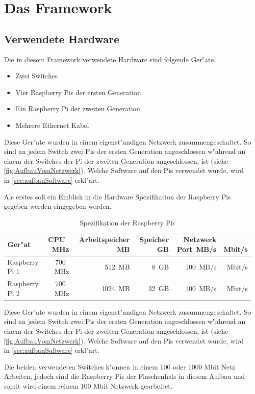 \chapter{Das Framework}
\label{cha:framework}


\section{Verwendete Hardware} \label{sec:verwendeteHardware}
Die in diesem Framework verwendete Hardware sind folgende Ger"ate. %
\begin{itemize}
\item Zwei Switches
\item Vier Raspberry Pis der ersten Generation
\item Ein Raspberry Pi der zweiten Generation
\item Mehrere Ethernet Kabel
\end{itemize}
Diese Ger"ate wurden in einem eigenst"andigen Netzwerk zusammengeschaltet. So sind an jedem Switch zwei Pis %
der ersten Generation angeschlossen w"ahrend an einem der Switches der Pi der zweiten Generation angeschlossen, %
ist (siehe \cref{fig:AufbauVomNetzwerk}). Welche Software auf den Pis verwendet wurde, wird in \cref{sec:aufbauSoftware} erkl"art. 

Als erstes soll  ein Einblick in die Hardware Spezifikation der Raspberry Pis gegeben werden eingegeben werden. 
\begin{table}
\centering
\begin{tabular}{l%
 r<{\,MHz}%
 r<{\,MB}%
 r<{\,GB}%
 r<{\,MB/s}%
 r<{\,Mbit/s}%
}
Ger"at 		& CPU	& Arbeitspeicher	& Speicher	& Netzwerk Port	\\
\hline
Raspberry Pi 1	& 700	& 512			& 8		& 100		\\
Raspberry Pi 2 	& 700 	& 1024			& 32		& 100		\\

\end{tabular}
\caption{Spezifikation der Raspberry Pis}
\label{tab:hardwarespezifiktion}
\end{table}
Diese Ger"ate wurden in einem eigenst"andigen Netzwerk zusammengeschaltet. So sind an jedem Switch zwei Pis %
der ersten Generation angeschlossen w"ahrend an einem der Switches der Pi der zweiten Generation angeschlossen, %
ist (siehe \cref{fig:AufbauVomNetzwerk}). Welche Software auf den Pis verwendet wurde, wird in \cref{sec:aufbauSoftware} erkl"art. 


Die beiden verwendeten Switches k"onnen in einem 100 oder 1000 Mbit Netz Arbeiten, jedoch sind die Raspberry Pis der Flaschenhals in diesem %
Aufbau und somit wird einem reinem 100 Mbit Netzwerk gearbeitet. 


